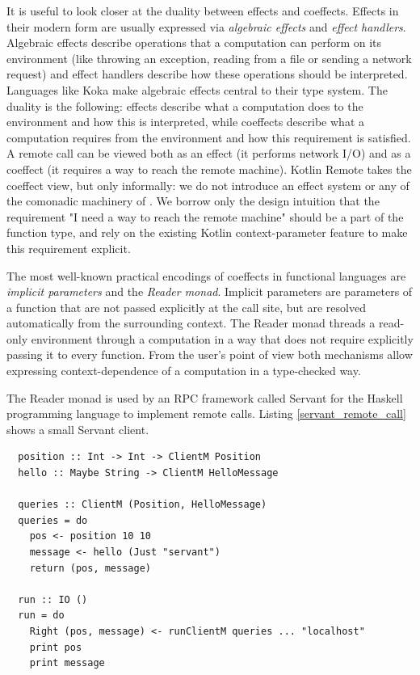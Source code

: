 \documentclass[a4paper,11pt,oneside]{article}
\newcommand{\term}[1]{\textit{#1}}
\begin{document}
It is useful to look closer at the duality between effects and coeffects. Effects in their
modern form are usually expressed via \term{algebraic effects} \cite{plotkin_handlers_2009} and
\term{effect handlers}. Algebraic effects describe operations that a computation can perform on
its environment (like throwing an exception, reading from a file or sending a network request)
and effect handlers describe how these operations should be interpreted. Languages like Koka
\cite{leijen_koka_nodate} make algebraic effects central to their type system. The duality is
the following: effects describe what a computation does to the environment and how this is
interpreted, while coeffects describe what a computation requires from the environment and how
this requirement is satisfied. A remote call can be viewed both as an effect (it performs network
I/O) and as a coeffect (it requires a way to reach the remote machine). Kotlin Remote takes the
coeffect view, but only informally: we do not introduce an effect system or any of the
comonadic machinery of \cite{petricek_coeffects_2013}. We borrow only the design intuition that
the requirement "I need a way to reach the remote machine" should be a part of the function
type, and rely on the existing Kotlin context-parameter feature to make this requirement
explicit.

The most well-known practical encodings of coeffects in functional languages are \term{implicit
parameters} \cite{lewis_implicit_2000} and the \term{Reader monad}. Implicit parameters are parameters
of a function that are not passed explicitly at the call site, but are resolved automatically
from the surrounding context. The Reader monad threads a read-only environment through a computation in a
way that does not require explicitly passing it to every function. From the user's point of view both
mechanisms allow expressing context-dependence of a computation in a type-checked way.

The Reader monad is used by an RPC framework called Servant \cite{noauthor_servant_nodate} for
the Haskell programming language to implement remote calls. Listing \ref{servant_remote_call}
shows a small Servant client.

\begin{listing}[!h]
  \begin{verbatim}
  position :: Int -> Int -> ClientM Position
  hello :: Maybe String -> ClientM HelloMessage

  queries :: ClientM (Position, HelloMessage)
  queries = do
    pos <- position 10 10
    message <- hello (Just "servant")
    return (pos, message)

  run :: IO ()
  run = do
    Right (pos, message) <- runClientM queries ... "localhost"
    print pos
    print message
  \end{verbatim}
  \caption{Remote function call in Servant}\label{servant_remote_call}
\end{listing}
\end{document}
